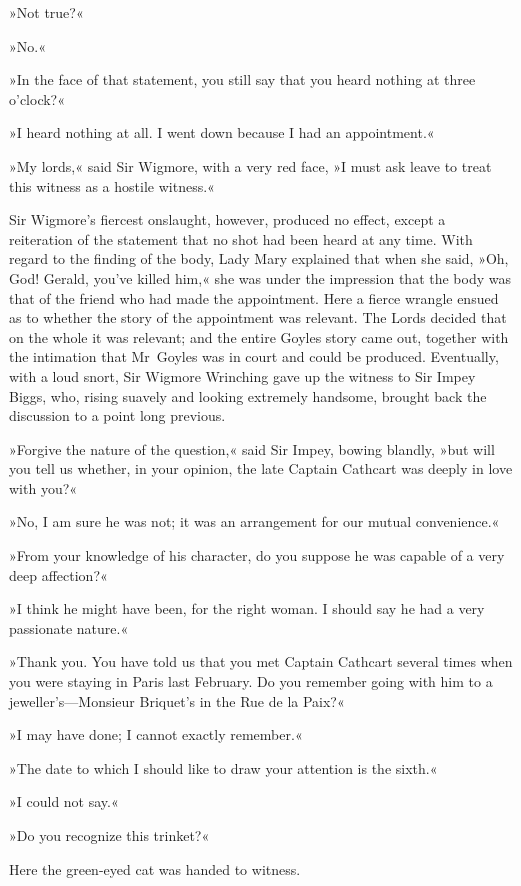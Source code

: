 »Not true?«

»No.«

»In the face of that statement, you still say that you heard nothing at three o'clock?«

»I heard nothing at all. I went down because I had an appointment.«

»My lords,« said Sir Wigmore, with a very red face, »I must ask leave to treat this witness as a hostile witness.«

Sir Wigmore's fiercest onslaught, however, produced no effect, except a reiteration of the statement that no shot had been heard at any time. With regard to the finding of the body, Lady Mary explained that when she said, »Oh, God! Gerald, you've killed him,« she was under the impression that the body was that of the friend who had made the appointment. Here a fierce wrangle ensued as to whether the story of the appointment was relevant. The Lords decided that on the whole it was relevant; and the entire Goyles story came out, together with the intimation that Mr~Goyles was in court and could be produced.  Eventually, with a loud snort, Sir Wigmore Wrinching gave up the witness to Sir Impey Biggs, who, rising suavely and looking extremely handsome, brought back the discussion to a point long previous.

»Forgive the nature of the question,« said Sir Impey, bowing blandly, »but will you tell us whether, in your opinion, the late Captain Cathcart was deeply in love with you?«

»No, I am sure he was not; it was an arrangement for our mutual convenience.«

»From your knowledge of his character, do you suppose he was capable of a very deep affection?«

»I think he might have been, for the right woman. I should say he had a very passionate nature.«

»Thank you. You have told us that you met Captain Cathcart several times when you were staying in Paris last February. Do you remember going with him to a jeweller's—Monsieur Briquet's in the Rue de la Paix?«

»I may have done; I cannot exactly remember.«

»The date to which I should like to draw your attention is the sixth.«

»I could not say.«

»Do you recognize this trinket?«

Here the green-eyed cat was handed to witness.

